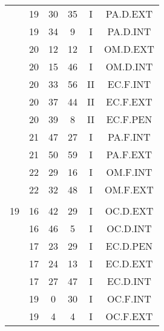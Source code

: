 \documentclass[12pt, a4paper]{article}
\begin{document}
\begin{multicols}{3}
{\begin{tabular}{c c c c c c}
	 	 	 	 & 19 & 30 & 35 & I & PA.D.EXT\\%
	 	 	 	 & 19 & 34 & 9 & I & PA.D.INT\\%
	 	 	 	 & 20 & 12 & 12 & I & OM.D.EXT\\%
	 	 	 	 & 20 & 15 & 46 & I & OM.D.INT\\%
	 	 	 	 & 20 & 33 & 56 & II & EC.F.INT\\%
	 	 	 	 & 20 & 37 & 44 & II & EC.F.EXT\\%
	 	 	 	 & 20 & 39 & 8 & II & EC.F.PEN\\%
	 	 	 	 & 21 & 47 & 27 & I & PA.F.INT\\%
	 	 	 	 & 21 & 50 & 59 & I & PA.F.EXT\\%
	 	 	 	 & 22 & 29 & 16 & I & OM.F.INT\\%
	 	 	 	 & 22 & 32 & 48 & I & OM.F.EXT\\%
	 	 	 	 & & & & & \\%
	 	 	 	19 & 16 & 42 & 29 & I & OC.D.EXT\\%
	 	 	 	 & 16 & 46 & 5 & I & OC.D.INT\\%
	 	 	 	 & 17 & 23 & 29 & I & EC.D.PEN\\%
	 	 	 	 & 17 & 24 & 13 & I & EC.D.EXT\\%
	 	 	 	 & 17 & 27 & 47 & I & EC.D.INT\\%
	 	 	 	 & 19 & 0 & 30 & I & OC.F.INT\\%
	 	 	 	 & 19 & 4 & 4 & I & OC.F.EXT\\%
	 	 \end{tabular}
 	}
\end{multicols}
\end{document}
